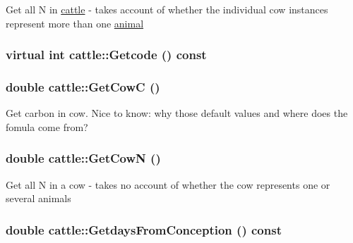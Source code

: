 \label{classcattle_a119738767d9cf6ef205a9e097f5f0fd6}
Get all N in \hyperlink{classcattle}{cattle} -\/ takes account of whether the individual cow instances represent more than one \hyperlink{classanimal}{animal} \hypertarget{classcattle_ad6b3b02f1b9c39b7872c5b4b875b987d}{
\subsubsection[{Getcode}]{\setlength{\rightskip}{0pt plus 5cm}virtual int cattle::Getcode () const}}
\label{classcattle_ad6b3b02f1b9c39b7872c5b4b875b987d}
\hypertarget{classcattle_a01c489501d6d56cb3af7bd22e266bd1f}{
\subsubsection[{GetCowC}]{\setlength{\rightskip}{0pt plus 5cm}double cattle::GetCowC ()}}
\label{classcattle_a01c489501d6d56cb3af7bd22e266bd1f}
Get carbon in cow. Nice to know: why those default values and where does the fomula come from? \hypertarget{classcattle_a8603e5213d0e6f8fecf19151c391d682}{
\subsubsection[{GetCowN}]{\setlength{\rightskip}{0pt plus 5cm}double cattle::GetCowN ()}}
\label{classcattle_a8603e5213d0e6f8fecf19151c391d682}
Get all N in a cow -\/ takes no account of whether the cow represents one or several animals \hypertarget{classcattle_add4227ea5e41412332ae7baa499cc54e}{
\subsubsection[{GetdaysFromConception}]{\setlength{\rightskip}{0pt plus 5cm}double cattle::GetdaysFromConception () const}}
